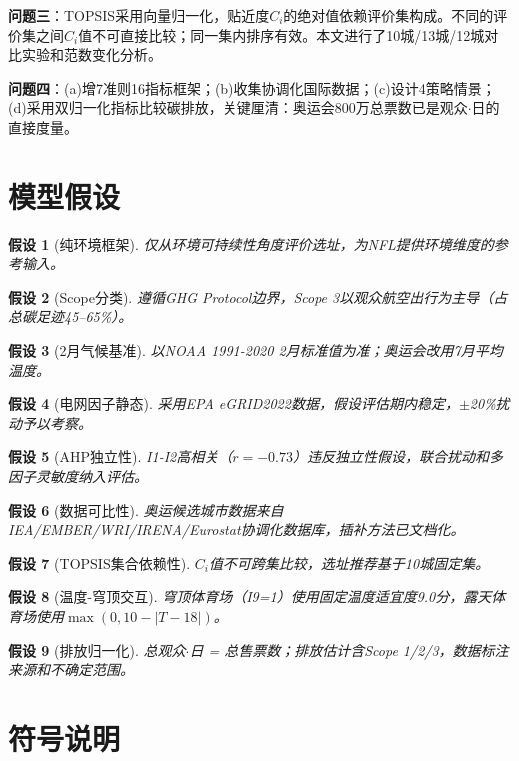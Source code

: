 \documentclass[12pt]{ctexart}
\newtheorem{assumption}{假设}
\begin{document}
\textbf{问题三}：TOPSIS采用向量归一化，贴近度$C_i$的绝对值依赖评价集构成。不同的评价集之间$C_i$值不可直接比较；同一集内排序有效。本文进行了10城/13城/12城对比实验和范数变化分析。

\textbf{问题四}：(a)增7准则16指标框架；(b)收集协调化国际数据；(c)设计4策略情景；(d)采用双归一化指标比较碳排放，关键厘清：奥运会800万总票数已是观众$\cdot$日的直接度量。

\section{模型假设}\label{sec:assumptions}

\begin{assumption}[纯环境框架]仅从环境可持续性角度评价选址，为NFL提供环境维度的参考输入。\end{assumption}
\begin{assumption}[Scope分类]遵循GHG Protocol边界，Scope 3以观众航空出行为主导（占总碳足迹45--65\%\cite{Jones2018}）。\end{assumption}
\begin{assumption}[2月气候基准]以NOAA 1991-2020 2月标准值为准\cite{NOAA}；奥运会改用7月平均温度。\end{assumption}
\begin{assumption}[电网因子静态]采用EPA eGRID2022数据，假设评估期内稳定，$\pm$20\%扰动予以考察。\end{assumption}
\begin{assumption}[AHP独立性]I1-I2高相关（$r=-0.73$）违反独立性假设，联合扰动和多因子灵敏度纳入评估。\end{assumption}
\begin{assumption}[数据可比性]奥运候选城市数据来自IEA/EMBER/WRI/IRENA/Eurostat协调化数据库\cite{IEA,WRI}，插补方法已文档化。\end{assumption}
\begin{assumption}[TOPSIS集合依赖性]$C_i$值不可跨集比较，选址推荐基于10城固定集。\end{assumption}
\begin{assumption}[温度-穹顶交互]穹顶体育场（I9=1）使用固定温度适宜度9.0分，露天体育场使用$\max(0,10-|T-18|)$。\end{assumption}
\begin{assumption}[排放归一化]总观众$\cdot$日 = 总售票数；排放估计含Scope 1/2/3，数据标注来源和不确定范围。\end{assumption}

\section{符号说明}\label{sec:notation}
\end{document}
